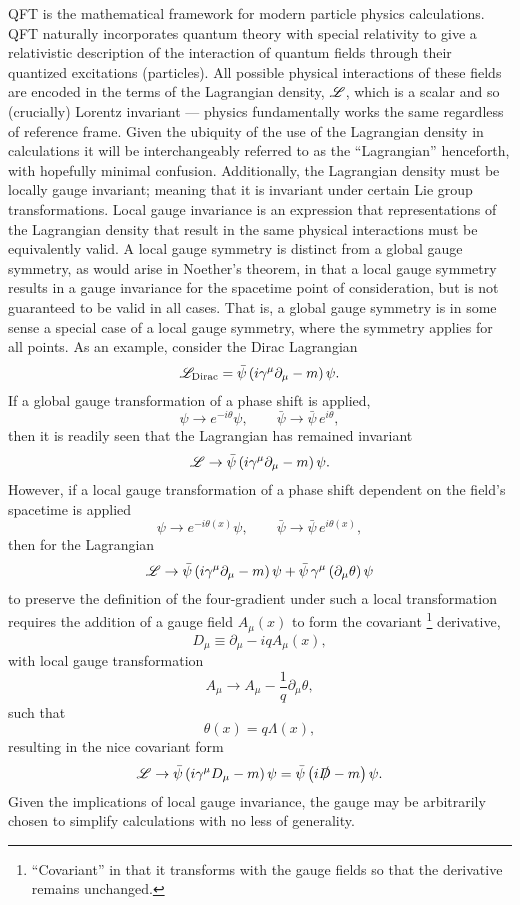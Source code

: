 \acrlong{QFT} is the mathematical framework for modern particle physics calculations.
QFT naturally incorporates quantum theory with special relativity to give a relativistic description of the interaction of quantum fields through their quantized excitations (particles).
All possible physical interactions of these fields are encoded in the terms of the Lagrangian density, $\mathscr{L}$, which is a scalar and so (crucially) Lorentz invariant --- physics fundamentally works the same regardless of reference frame.
Given the ubiquity of the use of the Lagrangian density in calculations it will be interchangeably referred to as the ``Lagrangian'' henceforth, with hopefully minimal confusion.
Additionally, the Lagrangian density must be locally gauge invariant; meaning that it is invariant under certain Lie group transformations.
Local gauge invariance is an expression that representations of the Lagrangian density that result in the same physical interactions must be equivalently valid.
A local gauge symmetry is distinct from a global gauge symmetry, as would arise in Noether's theorem, in that a local gauge symmetry results in a gauge invariance for the spacetime point of consideration, but is not guaranteed to be valid in all cases.
That is, a global gauge symmetry is in some sense a special case of a local gauge symmetry, where the symmetry applies for all points.
As an example, consider the Dirac Lagrangian
\begin{equation}
 \mathscr{L}_{\textrm{Dirac}} = \bar{\psi} \left(i \gamma^{\mu}\partial_{\mu} - m\right)\psi.
 \label{eq:Dirac_Lagrangian}
\end{equation}
If a global gauge transformation of a phase shift is applied,
\[
 \psi \to e^{-i\theta} \psi, \qquad \bar{\psi} \to \bar{\psi}\,e^{i\theta},
\]
then it is readily seen that the Lagrangian has remained invariant
\[
 \mathscr{L} \to \bar{\psi} \left(i \gamma^{\mu}\partial_{\mu} - m\right)\psi.
\]
However, if a local gauge transformation of a phase shift dependent on the field's spacetime is applied
\[
 \psi \to e^{-i\theta(x)} \psi, \qquad \bar{\psi} \to \bar{\psi}\,e^{i\theta(x)},
\]
then for the Lagrangian
\[
 \mathscr{L} \to \bar{\psi} \left(i \gamma^{\mu}\partial_{\mu} - m\right)\psi + \bar{\psi}\, \gamma^{\mu} \left(\partial_{\mu} \theta\right)\psi
\]
to preserve the definition of the four-gradient under such a local transformation requires the addition of a gauge field $A_{\mu}(x)$ to form the covariant%
\footnote{``Covariant'' in that it transforms with the gauge fields so that the derivative remains unchanged.}
derivative,
\[
 D_{\mu} \equiv \partial_{\mu} - iq A_{\mu}(x),
\]
with local gauge transformation
\[
 A_{\mu} \to A_{\mu} - \frac{1}{q} \partial_{\mu}\theta,
\]
such that
\[
 \theta(x) = q \Lambda(x),
\]
resulting in the nice covariant form
\[
 \mathscr{L} \to \bar{\psi} \left(i \gamma^{\mu}D_{\mu} - m\right)\psi = \bar{\psi} \left(i \slashed{D} - m\right)\psi.
\]
Given the implications of local gauge invariance, the gauge may be arbitrarily chosen to simplify calculations with no less of generality.

